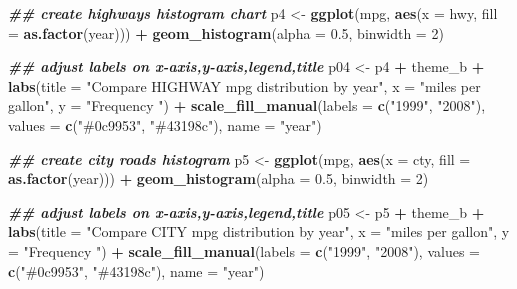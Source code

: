 \documentclass[
]{article}
\newenvironment{Shaded}{\begin{snugshade}}{\end{snugshade}}
\newcommand{\AttributeTok}[1]{\textcolor[rgb]{0.13,0.29,0.53}{#1}}
\newcommand{\DecValTok}[1]{\textcolor[rgb]{0.00,0.00,0.81}{#1}}
\newcommand{\DocumentationTok}[1]{\textcolor[rgb]{0.56,0.35,0.01}{\textbf{\textit{#1}}}}
\newcommand{\FloatTok}[1]{\textcolor[rgb]{0.00,0.00,0.81}{#1}}
\newcommand{\FunctionTok}[1]{\textcolor[rgb]{0.13,0.29,0.53}{\textbf{#1}}}
\newcommand{\NormalTok}[1]{#1}
\newcommand{\OtherTok}[1]{\textcolor[rgb]{0.56,0.35,0.01}{#1}}
\newcommand{\SpecialCharTok}[1]{\textcolor[rgb]{0.81,0.36,0.00}{\textbf{#1}}}
\newcommand{\StringTok}[1]{\textcolor[rgb]{0.31,0.60,0.02}{#1}}
\begin{document}
\begin{Shaded}
\begin{Highlighting}[]
\DocumentationTok{\#\# create highways histogram chart}
\NormalTok{p4 }\OtherTok{\textless{}{-}} \FunctionTok{ggplot}\NormalTok{(mpg, }\FunctionTok{aes}\NormalTok{(}\AttributeTok{x =}\NormalTok{ hwy, }\AttributeTok{fill =} \FunctionTok{as.factor}\NormalTok{(year))) }\SpecialCharTok{+}
  \FunctionTok{geom\_histogram}\NormalTok{(}\AttributeTok{alpha =} \FloatTok{0.5}\NormalTok{, }\AttributeTok{binwidth =} \DecValTok{2}\NormalTok{)}

\DocumentationTok{\#\# adjust labels on x{-}axis,y{-}axis,legend,title}
\NormalTok{p04 }\OtherTok{\textless{}{-}}
\NormalTok{p4 }\SpecialCharTok{+}\NormalTok{ theme\_b }\SpecialCharTok{+}
  \FunctionTok{labs}\NormalTok{(}\AttributeTok{title =} \StringTok{"Compare HIGHWAY mpg distribution by year"}\NormalTok{,}
       \AttributeTok{x =} \StringTok{"miles per gallon"}\NormalTok{,}
       \AttributeTok{y =} \StringTok{"Frequency "}\NormalTok{) }\SpecialCharTok{+}
  \FunctionTok{scale\_fill\_manual}\NormalTok{(}\AttributeTok{labels =} \FunctionTok{c}\NormalTok{(}\StringTok{"1999"}\NormalTok{, }\StringTok{"2008"}\NormalTok{), }
                    \AttributeTok{values =} \FunctionTok{c}\NormalTok{(}\StringTok{"\#0c9953"}\NormalTok{, }\StringTok{"\#43198c"}\NormalTok{),}
                    \AttributeTok{name =} \StringTok{"year"}\NormalTok{)}

\DocumentationTok{\#\# create city roads histogram}
\NormalTok{p5 }\OtherTok{\textless{}{-}} \FunctionTok{ggplot}\NormalTok{(mpg, }\FunctionTok{aes}\NormalTok{(}\AttributeTok{x =}\NormalTok{ cty, }\AttributeTok{fill =} \FunctionTok{as.factor}\NormalTok{(year))) }\SpecialCharTok{+}
  \FunctionTok{geom\_histogram}\NormalTok{(}\AttributeTok{alpha =} \FloatTok{0.5}\NormalTok{, }\AttributeTok{binwidth =} \DecValTok{2}\NormalTok{)}

\DocumentationTok{\#\# adjust labels on x{-}axis,y{-}axis,legend,title }
\NormalTok{p05 }\OtherTok{\textless{}{-}}
\NormalTok{p5 }\SpecialCharTok{+}\NormalTok{ theme\_b }\SpecialCharTok{+}
  \FunctionTok{labs}\NormalTok{(}\AttributeTok{title =} \StringTok{"Compare CITY mpg distribution by year"}\NormalTok{,}
       \AttributeTok{x =} \StringTok{"miles per gallon"}\NormalTok{,}
       \AttributeTok{y =} \StringTok{"Frequency "}\NormalTok{) }\SpecialCharTok{+}
  \FunctionTok{scale\_fill\_manual}\NormalTok{(}\AttributeTok{labels =} \FunctionTok{c}\NormalTok{(}\StringTok{"1999"}\NormalTok{, }\StringTok{"2008"}\NormalTok{), }
                    \AttributeTok{values =} \FunctionTok{c}\NormalTok{(}\StringTok{"\#0c9953"}\NormalTok{, }\StringTok{"\#43198c"}\NormalTok{),}
                    \AttributeTok{name =} \StringTok{"year"}\NormalTok{)}
\end{Highlighting}
\end{Shaded}
\end{document}
